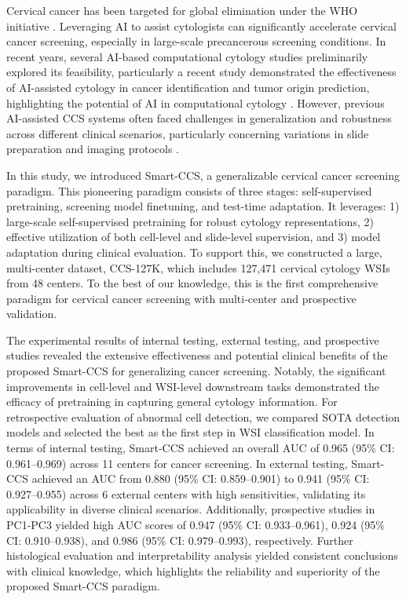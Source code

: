 Cervical cancer has been targeted for global elimination under the WHO initiative \cite{world2020global}. Leveraging AI to assist cytologists can significantly accelerate cervical cancer screening, especially in large-scale precancerous screening conditions. In recent years, several AI-based computational cytology studies preliminarily explored its feasibility, particularly a recent study demonstrated the effectiveness of AI-assisted cytology in cancer identification and tumor origin prediction, highlighting the potential of AI in computational cytology \cite{tian2024prediction,rassy2024predicting, li2024new}. However, previous AI-assisted CCS systems often faced challenges in generalization and robustness across different clinical scenarios, particularly concerning variations in slide preparation and imaging protocols \cite{cheng2021robust,wang2024artificial,zhu2021hybrid,wu2024development}. 

In this study, we introduced Smart-CCS, a generalizable cervical cancer screening paradigm. This pioneering paradigm consists of three stages: self-supervised pretraining, screening model finetuning, and test-time adaptation. It leverages: 1) large-scale self-supervised pretraining for robust cytology representations, 2) effective utilization of both cell-level and slide-level supervision, and 3) model adaptation during clinical evaluation. To support this, we constructed a large, multi-center dataset, CCS-127K, which includes 127,471 cervical cytology WSIs from 48 centers. To the best of our knowledge, this is the first comprehensive paradigm for cervical cancer screening with multi-center and prospective validation.

The experimental results of internal testing, external testing, and prospective studies revealed the extensive effectiveness and potential clinical benefits of the proposed Smart-CCS for generalizing cancer screening. 
Notably, the significant improvements in cell-level and WSI-level downstream tasks demonstrated the efficacy of pretraining in capturing general cytology information. For retrospective evaluation of abnormal cell detection, we compared SOTA detection models and selected the best as the first step in WSI classification model. In terms of internal testing, Smart-CCS achieved an overall AUC of 0.965 (95\% CI: 0.961–0.969) across 11 centers for cancer screening. 
In external testing, Smart-CCS achieved an AUC from 0.880 (95\% CI: 0.859–0.901) to 0.941 (95\% CI: 0.927–0.955)  across 6 external centers with high sensitivities, validating its applicability in diverse clinical scenarios. Additionally, prospective studies in PC1-PC3 yielded high AUC scores of 0.947 (95\% CI: 0.933–0.961), 0.924 (95\% CI: 0.910–0.938), and 0.986 (95\% CI: 0.979–0.993), respectively. Further histological evaluation and interpretability analysis yielded consistent conclusions with clinical knowledge, which highlights the reliability and superiority of the proposed Smart-CCS paradigm.


